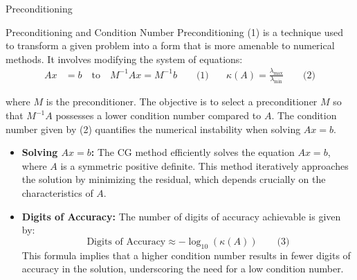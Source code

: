 \documentclass{beamer}
\begin{document}
\begin{frame}{Preconditioning}
  \footnotesize 
    \begin{block}{Preconditioning and Condition Number}
        Preconditioning (1) is a technique used to transform a given problem into a form that is more amenable to numerical methods. It involves modifying the system of equations:
    \begin{align*}
        Ax &= b \quad \text{to} \quad M^{-1}Ax = M^{-1}b \qquad \text{(1)} & \quad \kappa(A) = \frac{\lambda_{\max}}{\lambda_{\min}} \qquad \text{(2)}
    \end{align*}
        
        where \( M \) is the preconditioner. The objective is to select a preconditioner \( M \) so that \( M^{-1}A \) possesses a lower condition number compared to \( A \). The condition number given by (2) quantifies the numerical instability when solving \( Ax = b \).        

  \begin{itemize}
    \item \textbf{Solving \(Ax = b\):} The CG method efficiently solves the equation \(Ax = b\), where \(A\) is a symmetric positive definite. This method iteratively approaches the solution by minimizing the residual, which depends crucially on the characteristics of \(A\).

    \item \textbf{Digits of Accuracy:} The number of digits of accuracy achievable is given by:
      \[
      \text{Digits of Accuracy} \approx -\log_{10}(\kappa(A))  \qquad \text{(3)}
      \] 
      This formula implies that a higher condition number results in fewer digits of accuracy in the solution, underscoring the need for a low condition number.
  \end{itemize}

\end{block}

  \normalsize 
\end{frame}
\end{document}
